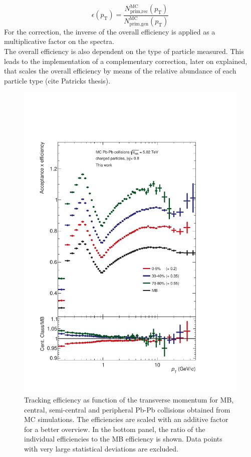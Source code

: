 \documentclass[12pt,a4paper]{report}
\begin{document}
\begin{equation}
\epsilon(p_\text{T}) = \dfrac{N_\text{prim,rec}^\text{MC}(p_\text{T})}{N_\text{prim,gen}^\text{MC}(p_\text{T})} 
\label{trckEffEq}
\end{equation}
For the correction, the inverse of the overall efficiency is applied as a multiplicative factor on the \pt spectra.\\
The overall efficiency is also dependent on the type of particle measured. This leads to the implementation of a complementary correction, later on explained, that scales the overall efficiency by means of the relative abundance of each particle type (cite Patricks thesis).\\
\begin{figure}[tb!]
\centering
\includegraphics[width=12cm]{Plots/trckEffPbPb1.pdf}  
\caption{Tracking efficiency as function of the transverse momentum for MB, central, semi-central and peripheral Pb-Pb collisions obtained from MC simulations. The efficiencies are scaled with an additive factor for a better overview. In the bottom panel, the ratio of the individual efficiencies to the MB efficiency is shown. Data points with very large statistical deviations are excluded.}
\label{trckEffPbPb1}
\end{figure}
\end{document}
